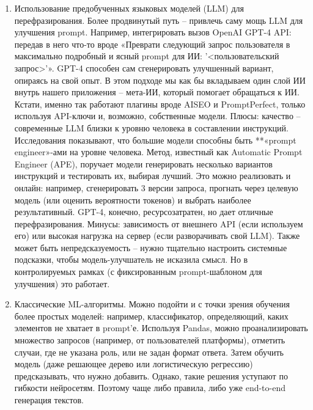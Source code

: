 \begin{enumerate}[label=\arabic*.]
\item Использование предобученных языковых моделей (LLM) для перефразирования. Более продвинутый путь – привлечь саму мощь LLM для улучшения prompt. Например, интегрировать вызов OpenAI GPT-4 API: передав в него что-то вроде «Преврати следующий запрос пользователя в максимально подробный и ясный prompt для ИИ: '<пользовательский запрос>'». GPT-4 способен сам сгенерировать улучшенный вариант, опираясь на свой опыт. В этом подходе мы как бы вкладываем один слой ИИ внутрь нашего приложения – мета-ИИ, который помогает обращаться к ИИ. Кстати, именно так работают плагины вроде AISEO и PromptPerfect, только используя API-ключи и, возможно, собственные модели. Плюсы: качество – современные LLM близки к уровню человека в составлении инструкций\cite{restack:advprompt}. Исследования показывают, что большие модели способны быть **«prompt engineer»-ами на уровне человека\cite{arxiv:2211.01910}. Метод, известный как Automatic Prompt Engineer (APE), поручает модели генерировать несколько вариантов инструкций и тестировать их, выбирая лучший\cite{restack:advprompt}. Это можно реализовать и онлайн: например, сгенерировать 3 версии запроса, прогнать через целевую модель (или оценить вероятности токенов) и выбрать наиболее результативный. GPT-4, конечно, ресурсозатратен, но дает отличные перефразирования. Минусы: зависимость от внешнего API (если используем его) или высокая нагрузка на сервер (если разворачивать свой LLM). Также может быть непредсказуемость – нужно тщательно настроить системные подсказки, чтобы модель-улучшатель не исказила смысл. Но в контролируемых рамках (с фиксированным prompt-шаблоном для улучшения) это работает.


\item Классические ML-алгоритмы. Можно подойти и с точки зрения обучения более простых моделей: например, классификатор, определяющий, каких элементов не хватает в prompt’е. Используя Pandas, можно проанализировать множество запросов (например, от пользователей платформы), отметить случаи, где не указана роль, или не задан формат ответа. Затем обучить модель (даже решающее дерево или логистическую регрессию) предсказывать, что нужно добавить. Однако, такие решения уступают по гибкости нейросетям. Поэтому чаще либо правила, либо уже end-to-end генерация текстов.


\end{enumerate}
